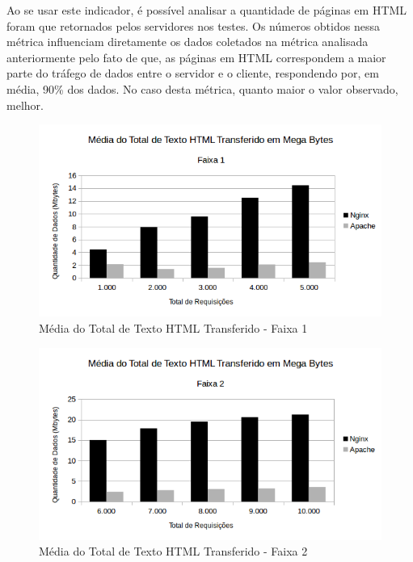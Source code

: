Ao se usar este indicador, é possível analisar a quantidade de páginas em HTML 
foram que retornados pelos servidores nos testes. Os números obtidos nessa 
métrica influenciam diretamente os dados coletados na métrica analisada 
anteriormente pelo fato de que, as páginas em HTML correspondem a maior parte 
do tráfego de dados entre o servidor e o cliente, respondendo por, em média, 
90\% dos dados. No caso desta métrica, quanto maior o valor observado, melhor.

\begin{figure}[H]
	\centering
	\includegraphics[width=1\linewidth]{graficos/grafico3-f1} 
	\caption{Média do Total de Texto HTML Transferido - Faixa 1}
	\label{fig:grafico3-f1}
\end{figure}

\begin{figure}[H]
	\centering
	\includegraphics[width=1\linewidth]{graficos/grafico3-f2} 
	\caption{Média do Total de Texto HTML Transferido - Faixa 2}
	\label{fig:grafico3-f2}
\end{figure}

